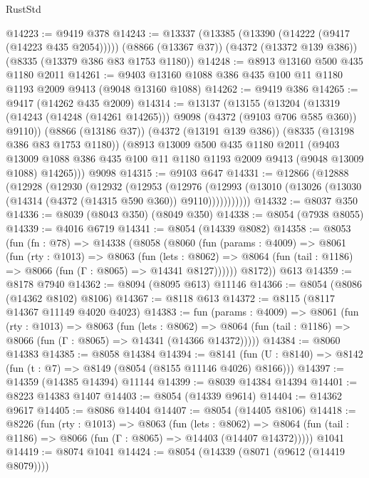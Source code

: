 \begin{lexlean}{RustStd}
\begin{coremodule}
@14223 := @9419 @378
@14243 := @13337
    (@13385 (@13390 (@14222 (@9417 (@14223 @435 @2054)))))
    (@8866 (@13367 @37))
    (@4372 (@13372 @139 @386))
    (@8335 (@13379 @386 @83 @1753 @1180))
@14248 := @8913 @13160 @500 @435 @1180 @2011
@14261 := @9403 @13160 @1088 @386 @435 @100 @11 @1180 @1193 @2009 @9413 (@9048 @13160 @1088)
@14262 := @9419 @386
@14265 := @9417 (@14262 @435 @2009)
@14314 := @13137
    (@13155
      (@13204 (@13319 (@14243 (@14248 (@14261 @14265))) @9098 (@4372 (@9103 @706 @585 @360)) @9110))
      (@8866 (@13186 @37))
      (@4372 (@13191 @139 @386))
      (@8335 (@13198 @386 @83 @1753 @1180))
      (@8913
        @13009
        @500
        @435
        @1180
        @2011
        (@9403
          @13009
          @1088
          @386
          @435
          @100
          @11
          @1180
          @1193
          @2009
          @9413
          (@9048 @13009 @1088)
          @14265)))
    @9098
@14315 := @9103 @647
@14331 := @12866
    (@12888
      (@12928
        (@12930
          (@12932
            (@12953
              (@12976
                (@12993 (@13010 (@13026 (@13030 (@14314 (@4372 (@14315 @590 @360)) @9110)))))))))))
@14332 := @8037 @350
@14336 := @8039 (@8043 @350) (@8049 @350)
@14338 := @8054 (@7938 @8055)
@14339 := @4016 @6719
@14341 := @8054 (@14339 @8082)
@14358 := @8053
    (fun (fn : @78) =>
    @14338
      (@8058
        (@8060
          (fun (params : @4009) =>
          @8061
            (fun (rty : @1013) =>
            @8063
              (fun (lets : @8062) =>
              @8064 (fun (tail : @1186) => @8066 (fun (Γ : @8065) => @14341 @8127))))))
        @8172))
    @613
@14359 := @8178 @7940
@14362 := @8094 (@8095 @613) @11146
@14366 := @8054 (@8086 (@14362 @8102) @8106)
@14367 := @8118 @613
@14372 := @8115 (@8117 @14367 @11149 @4020 @4023)
@14383 := fun (params : @4009) =>
  @8061
    (fun (rty : @1013) =>
    @8063
      (fun (lets : @8062) =>
      @8064 (fun (tail : @1186) => @8066 (fun (Γ : @8065) => @14341 (@14366 @14372)))))
@14384 := @8060 @14383
@14385 := @8058 @14384
@14394 := @8141
    (fun (U : @8140) => @8142 (fun (t : @7) => @8149 (@8054 (@8155 @11146 @4026) @8166)))
@14397 := @14359 (@14385 @14394) @11144
@14399 := @8039 @14384 @14394
@14401 := @8223 @14383 @1407
@14403 := @8054 (@14339 @9614)
@14404 := @14362 @9617
@14405 := @8086 @14404
@14407 := @8054 (@14405 @8106)
@14418 := @8226
    (fun (rty : @1013) =>
    @8063
      (fun (lets : @8062) =>
      @8064 (fun (tail : @1186) => @8066 (fun (Γ : @8065) => @14403 (@14407 @14372)))))
    @1041
@14419 := @8074 @1041
@14424 := @8054 (@14339 (@8071 (@9612 (@14419 @8079))))

\end{coremodule}
\end{lexlean}
